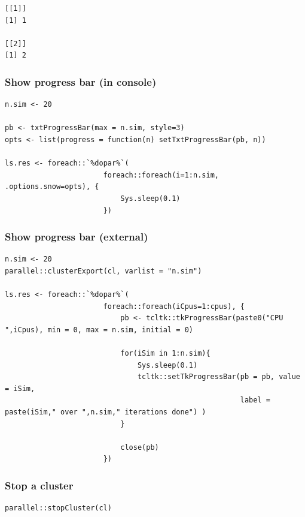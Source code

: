 \documentclass{article}
\begin{document}
\begin{verbatim}
[[1]]
[1] 1

[[2]]
[1] 2
\end{verbatim}

\subsubsection{Show progress bar (in console)}
\label{sec:org5dcd1d3}

\lstset{language=r,label= ,caption= ,captionpos=b,numbers=none}
\begin{lstlisting}
n.sim <- 20

pb <- txtProgressBar(max = n.sim, style=3)
opts <- list(progress = function(n) setTxtProgressBar(pb, n))

ls.res <- foreach::`%dopar%`(
                       foreach::foreach(i=1:n.sim, .options.snow=opts), {
                           Sys.sleep(0.1)
                       })
\end{lstlisting}

\subsubsection{Show progress bar (external)}
\label{sec:orgc46113d}

\lstset{language=r,label= ,caption= ,captionpos=b,numbers=none}
\begin{lstlisting}
n.sim <- 20
parallel::clusterExport(cl, varlist = "n.sim")

ls.res <- foreach::`%dopar%`(
                       foreach::foreach(iCpus=1:cpus), {
                           pb <- tcltk::tkProgressBar(paste0("CPU ",iCpus), min = 0, max = n.sim, initial = 0)

                           for(iSim in 1:n.sim){
                               Sys.sleep(0.1)
                               tcltk::setTkProgressBar(pb = pb, value = iSim,
                                                       label = paste(iSim," over ",n.sim," iterations done") )
                           }

                           close(pb)
                       })
\end{lstlisting}

\subsubsection{Stop a cluster}
\label{sec:org9e22f6e}

\lstset{language=r,label= ,caption= ,captionpos=b,numbers=none}
\begin{lstlisting}
parallel::stopCluster(cl)
\end{lstlisting}
\end{document}
